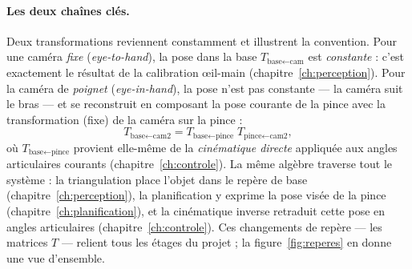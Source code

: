 \paragraph{Les deux chaînes clés.} Deux transformations reviennent constamment et illustrent la convention. Pour une caméra \emph{fixe} (\emph{eye-to-hand}), la pose dans la base $T_{\text{base}\leftarrow\text{cam}}$ est \emph{constante} : c'est exactement le résultat de la calibration œil-main (chapitre~\ref{ch:perception}). Pour la caméra de \emph{poignet} (\emph{eye-in-hand}), la pose n'est pas constante --- la caméra suit le bras --- et se reconstruit en composant la pose courante de la pince avec la transformation (fixe) de la caméra sur la pince :
\[
  T_{\text{base}\leftarrow\text{cam2}} = T_{\text{base}\leftarrow\text{pince}}\;T_{\text{pince}\leftarrow\text{cam2}},
\]
où $T_{\text{base}\leftarrow\text{pince}}$ provient elle-même de la \emph{cinématique directe} appliquée aux angles articulaires courants (chapitre~\ref{ch:controle}). La même algèbre traverse tout le système : la triangulation place l'objet dans le repère de base (chapitre~\ref{ch:perception}), la planification y exprime la pose visée de la pince (chapitre~\ref{ch:planification}), et la cinématique inverse retraduit cette pose en angles articulaires (chapitre~\ref{ch:controle}). Ces changements de repère --- les matrices $T$ --- relient tous les étages du projet ; la figure~\ref{fig:reperes} en donne une vue d'ensemble.


